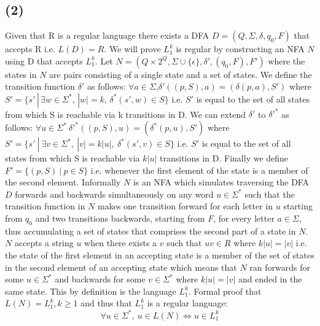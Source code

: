 \documentclass[12pt]{article}
\begin{document}
\subsection*{(2)}
Given that R is a regular language there exists a DFA
  $D = (Q, \Sigma, \delta, q_0, F)$ that accepts R i.e. $L(D) = R$.
  We will prove $L_1^k$ is regular by constructing
  an NFA $N$ using D that accepts $L_1^k$. Let $N = (Q \times 2^Q,
  \Sigma \cup \{\epsilon\}, \delta{'}, (q_0 , F), F')$ where the states in $N$
  are pairs consisting of a single state and a set of states. We define the
  transition function $\delta{'}$ as follows:
  \newline
  \indent $\forall a \in \Sigma$,\:$\delta{'}((p,S), a) = (\delta(p,a), S')$ where
  $S'= \{s'\,|\,\exists w \in \Sigma^*,\,|w| = k,\, \delta^*(s',w) \in S\}$
  \newline
  \indent i.e. $S'$ is equal to the set of all states from which S is reachable
  via k transitions in D.
  \newline
  We can extend $\delta{'}$ to $\delta{'}^*$ as follows:
  \newline
  \indent $\forall u \in \Sigma^*\: \delta{'}^* ((p,S),u) = (\delta^* (p, u),S')$
  where $S' = \{s'\:|\:\exists v \in \Sigma^* ,\: |v|=k|u| ,\:
  \delta^* (s', v) \in S\}$
  \newline
  \indent i.e. $S'$ is equal to the set of all states from which S is reachable
  via $k|u|$ transitions in D.
  \newline
  Finally we define $F'=\{(p,S)\:|\: p \in S\}$ i.e. whenever the first element
  of the state is a member of the second element. Informally $N$ is an NFA which
  simulates traversing the DFA $D$ forwards and backwards simultaneously on any
  word $u \in \Sigma^*$ such that the transition function in $N$ makes one
  transition forward for each letter in $u$ starting from $q_0$ and two
  transitions backwards, starting from $F$, for every letter $a\in\Sigma$, thus
  accumulating a set of states that comprises the second part of a state in $N$.
  $N$ accepts a string $u$ when there exists a $v$ such that $uv \in R$ where
  $k|u| = |v|$ i.e. the state of the first element in an accepting state
  is a member of the set of states in the second element of an accepting state
  which means that $N$ ran forwards for some $u \in \Sigma^*$ and backwards for
  some $v \in \Sigma^*$ where $k|u| = |v|$ and ended in the same state.
  This by definition is the language $L_1^k$.
  Formal proof that $L(N) = L_1^k, k \ge 1$ and
  thus that $L_1^k$ is a regular language:
  $$\forall u \in \Sigma^* ,\: u \in L(N) \iff u \in L_1^k$$
\end{document}
